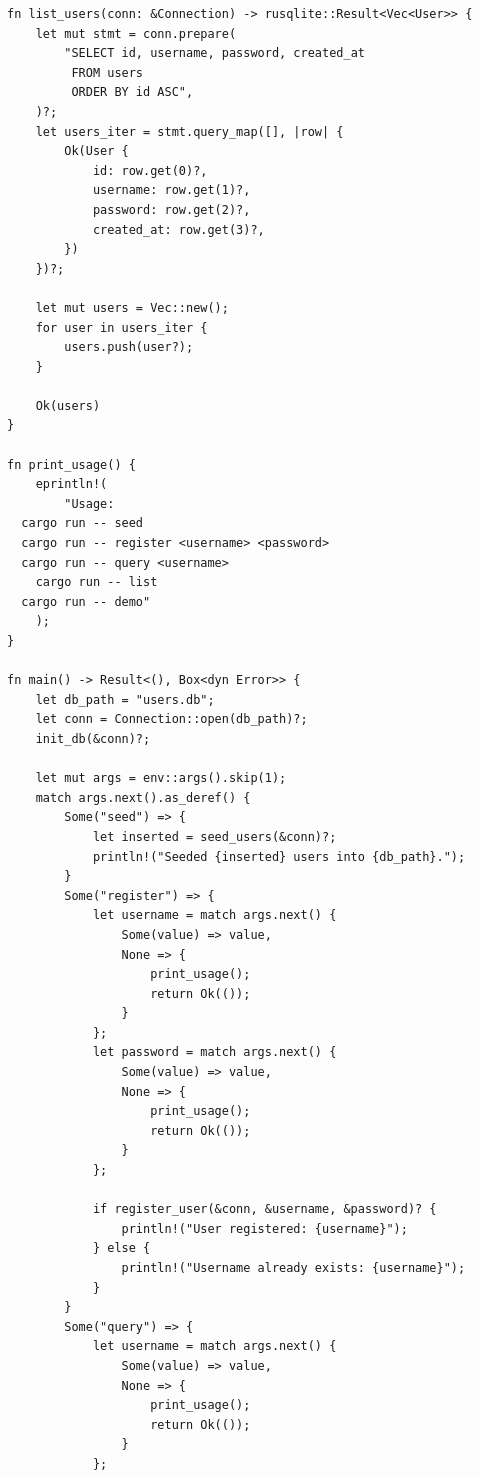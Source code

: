 \documentclass[12pt,a4paper]{ctexart}
\begin{document}
\begin{lstlisting}
fn list_users(conn: &Connection) -> rusqlite::Result<Vec<User>> {
    let mut stmt = conn.prepare(
        "SELECT id, username, password, created_at
         FROM users
         ORDER BY id ASC",
    )?;
    let users_iter = stmt.query_map([], |row| {
        Ok(User {
            id: row.get(0)?,
            username: row.get(1)?,
            password: row.get(2)?,
            created_at: row.get(3)?,
        })
    })?;

    let mut users = Vec::new();
    for user in users_iter {
        users.push(user?);
    }

    Ok(users)
}

fn print_usage() {
    eprintln!(
        "Usage:
  cargo run -- seed
  cargo run -- register <username> <password>
  cargo run -- query <username>
    cargo run -- list
  cargo run -- demo"
    );
}

fn main() -> Result<(), Box<dyn Error>> {
    let db_path = "users.db";
    let conn = Connection::open(db_path)?;
    init_db(&conn)?;

    let mut args = env::args().skip(1);
    match args.next().as_deref() {
        Some("seed") => {
            let inserted = seed_users(&conn)?;
            println!("Seeded {inserted} users into {db_path}.");
        }
        Some("register") => {
            let username = match args.next() {
                Some(value) => value,
                None => {
                    print_usage();
                    return Ok(());
                }
            };
            let password = match args.next() {
                Some(value) => value,
                None => {
                    print_usage();
                    return Ok(());
                }
            };

            if register_user(&conn, &username, &password)? {
                println!("User registered: {username}");
            } else {
                println!("Username already exists: {username}");
            }
        }
        Some("query") => {
            let username = match args.next() {
                Some(value) => value,
                None => {
                    print_usage();
                    return Ok(());
                }
            };


\end{lstlisting}
\end{document}
